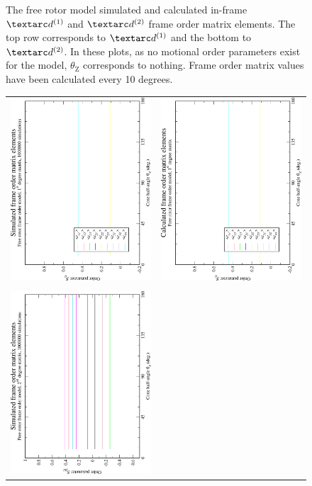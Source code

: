 \begin{figure}
\begin{tabular}{@{}cc@{}}
  \end{tabular}
  \caption[Free rotor simulated and calculated in-frame Daeg$^{(1)}$ and Daeg$^{(2)}$ elements.]{
    The free rotor model simulated and calculated in-frame $\FOone$ and $\FOtwo$ frame order matrix elements.
    The top row corresponds to $\FOone$ and the bottom to $\FOtwo$.
    In these plots, as no motional order parameters exist for the model, $\theta_\textrm{Z}$ corresponds to nothing.
    Frame order matrix values have been calculated every 10 degrees.
  }
  \label{fig: simulated and calculated in-frame 1st and 2nd degree free rotor frame order}
\end{figure}

\begin{figure}
\centering
  \begin{tabular}{@{}cc@{}}
    \includegraphics[width=.35\textwidth,angle=270]{images/frame_order_matrix/Sij_free_rotor_out_of_frame_theta_z_ens1000000.eps} &
    \includegraphics[width=.35\textwidth,angle=270]{images/frame_order_matrix/Sij_free_rotor_out_of_frame_theta_z_calc.eps} \\
    \\[-5pt]
    \includegraphics[width=.35\textwidth,angle=270]{images/frame_order_matrix/Sijkl_free_rotor_out_of_frame_theta_z_ens1000000.eps} &

\end{tabular}
\end{figure}
